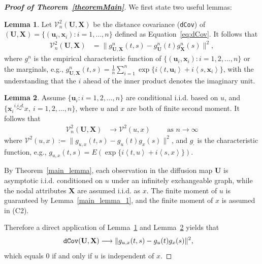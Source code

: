 \documentclass[12pt]{article}
\theoremstyle{definition}
\newtheorem{lemma}{Lemma}
\begin{document}
	\begin{proof}[\textbf{Proof of Theorem~\ref{theoremMain}}]
		
		We first state two useful lemmas:
		\begin{lemma}
			\label{lemma2}
			Let $\mathcal{V}^2_{n}(\mathbf{U}, \mathbf{X})$ be the distance covariance (\texttt{dCov}) of $(\mathbf{U}, \mathbf{X}) = \{  ( \mathbf{u}_{i}, \mathbf{x}_{i}  )  : i = 1, \ldots, n \}$ defined as Equation~\ref{eq:dCov}.
			It follows that
			\begin{eqnarray}
			\mathcal{V}^{2}_{n}(\mathbf{U},\mathbf{X}) &=   \|g_{\mathbf{U},\mathbf{X}}^{n}(t,s)-g_{\mathbf{U}}^{n}(t)g_{\mathbf{X}}^{n}(s)\|^{2},
			\end{eqnarray}
			where $g_{\cdot}^{n}$ is the empirical characteristic function of $\{(\mathbf{u}_{i},\mathbf{x}_{i}) : i=1,2,...,n\}$ or the marginals, e.g., $g_{\mathbf{U},\mathbf{X}}^{n}(t,s)=\frac{1}{n}\sum_{i=1}^{n}\exp\{i \left\langle t,\mathbf{u}_{i} \right\rangle+i \left\langle s,\mathbf{x}_{i} \right\rangle\}$, with the understanding that the $i$ ahead of the inner product denotes the imaginary unit.
		\end{lemma}
		
		\begin{lemma}
			\label{lemma3}
			Assume $\{ \mathbf{u}_{i} : i = 1,2, \ldots, n \}$ are conditional i.i.d. based on $u$, and $\{\mathbf{x}_{i} \stackrel{i.i.d.}{\sim} x,~i = 1, 2, \ldots, n\}$, where $u$ and $x$ are both of finite second moment. It follows that
			\begin{eqnarray}
			\mathcal{V}_{n}^{2}(\mathbf{U},\mathbf{X}) &\longrightarrow \mathcal{V}^{2}(u,x) \quad \quad \mbox{ as } n \rightarrow \infty
			\label{eq:conv1}
			\end{eqnarray}
			where $\mathcal{V}^{2} (u,x) := \| g_{u,x}(t,s) - g_{u}(t) g_{x}(s) \|^2$, and $g_{\cdot}$ is the characteristic function, e.g., $g_{u,x}(t,s) = E(\exp\{i \left\langle t,u \right\rangle  +i \left\langle  s,x\right\rangle \})$.
		\end{lemma}
		
		By Theorem~\ref{main_lemma}, each observation in the diffusion map $\mathbf{U}$ is asymptotic i.i.d. conditioned on $u$ under an infinitely exchangeable graph, while the nodal attributes $\mathbf{X}$ are assumed i.i.d. as $x$. The finite moment of $u$ is guaranteed by Lemma~\ref{main_lemma_1}, and the finite moment of $x$ is assumed in (C2).
		
		Therefore a direct application of Lemma~\ref{lemma2} and Lemma~\ref{lemma3} yields that
		\begin{eqnarray}
		\mbox{\texttt{dCov}}(\mathbf{U},\mathbf{X}) &\longrightarrow \| g_{u,x}(t,s) - g_{u}(t) g_{x}(s) \|^2,
		\end{eqnarray}
		which equals $0$ if and only if $u$ is independent of $x$.
		

\end{proof}
\end{document}
